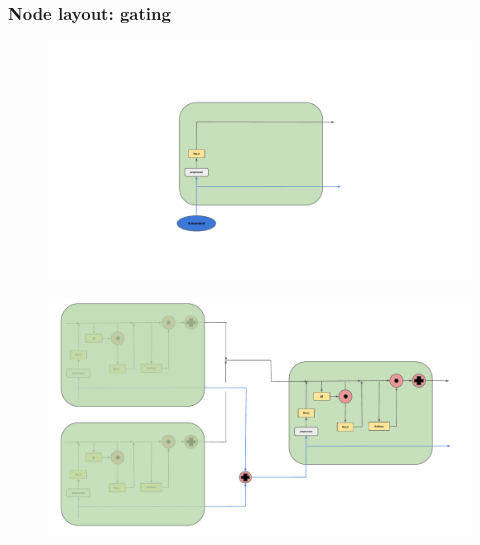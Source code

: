 \subsubsection{Node layout: gating}


\begin{figure}
    \begin{center}
        \includegraphics[width=\textwidth]{Images/Schema_RecNN_Leaf.pdf}
        \label{sub:RecNNLeafNode}
    
        \includegraphics[width=\textwidth]{Images/Schema_RecNN.pdf}
        \label{sub:RecNNNode}
    
    

\end{center}
\end{figure}
